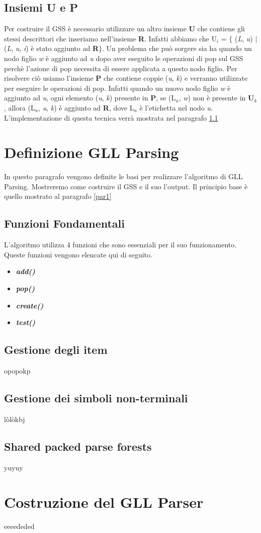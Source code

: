 \subsection{Insiemi U e P}
Per costruire il GSS è necessario utilizzare un altro insieme \textbf{U} che contiene gli stessi descrittori che inseriamo nell'insieme \textbf{R}. Infatti abbiamo che U$_i$ = $\{$ (\textit{L}, \textit{u}) $\mid$ (\textit{L}, \textit{u}, \textit{i}) è stato aggiunto ad \textbf{R}$\}$. Un problema \cite{pubblicazione: scott} che può sorgere sia ha quando un nodo figlio \textit{w} è aggiunto ad \textit{u} dopo aver eseguito le operazioni di pop sul GSS perchè l'azione di pop necessita di essere applicata a questo nodo figlio. Per risolvere ciò usiamo l'insieme \textbf{P} che contiene coppie (\textit{u}, \textit{k}) e verranno utilizzate per eseguire le operazioni di pop. Infatti quando un nuovo nodo figlio \textit{w} è aggiunto ad \textit{u}, ogni elemento (\textit{u}, \textit{k}) presente in \textbf{P}, se (L$_u$, \textit{w}) non è presente in \textbf{U$_k$}, allora (L$_u$, \textit{u}, \textit{k}) è aggiunto ad \textbf{R}, dove L$_u$ è l'etichetta nel nodo \textit{u}. L'implementazione di questa tecnica verrà mostrata nel paragrafo \ref{par}
\section{Definizione GLL Parsing}
In questo paragrafo vengono definite le basi per realizzare l'algoritmo di GLL Parsing. Mostreremo come costruire il GSS e il suo l'output. Il principio base è quello mostrato al paragrafo \ref{par1}
\subsection{Funzioni Fondamentali}\label{par}
L'algoritmo utilizza 4 funzioni che sono essenziali per il suo funzionamento. Queste funzioni vengono elencate qui di seguito.
\begin{itemize}
	\item \textbf{\textit{add()}}
	\item \textbf{\textit{pop()}}
	\item \textbf{\textit{create()}}
	\item \textbf{\textit{test()}}
\end{itemize}
\subsection{Gestione degli item}
opopokp
\subsection{Gestione dei simboli non-terminali}
lòlòkbj
\subsection{Shared packed parse forests}
yuyuy
\section{Costruzione del GLL Parser}
eeeededed